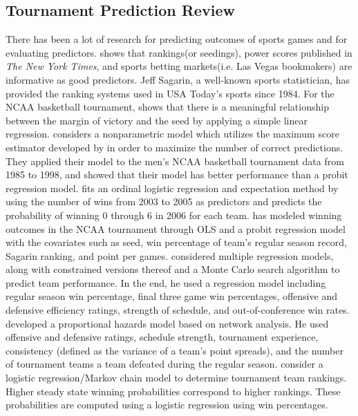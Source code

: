 \subsection{Tournament Prediction Review}
There has been a lot of research for predicting outcomes of sports games and for evaluating predictors. \cite{boulier2003predicting} shows that rankings(or seedings), power scores published in \emph{The New York Times}, and sports betting markets(i.e. Las Vegas bookmakers) are informative as good predictors. Jeff Sagarin, a well-known sports statistician, has provided the ranking systems used in USA Today's sports since 1984. For the NCAA basketball tournament, \cite{smith1999can} shows that there is a meaningful relationship between the margin of victory and the seed by applying a simple linear regression. \cite{caudill2003predicting} considers a nonparametric model which utilizes the maximum score estimator developed by \cite{manski1977estimation} in order to maximize the number of correct predictions. They applied their model to the men's NCAA basketball tournament data from 1985 to 1998, and showed that their model has better performance than a probit regression model. \cite{west2006simple} fits an ordinal logistic regression and expectation method by using the number of wins from 2003 to 2005 as predictors and predicts the probability of winning 0 through 6 in 2006 for each team. \cite{wright2012statistical} has modeled winning outcomes in the NCAA tournament through OLS and a probit regression model with the covariates such as seed, win percentage of team's regular season record, Sagarin ranking, and point per games. \cite{rosenthal} considered multiple regression models, along with constrained versions thereof and a Monte Carlo search algorithm to predict team performance. In the end, he used a regression model including regular season win percentage, final three game win percentages, offensive and defensive efficiency ratings, strength of schedule, and out-of-conference win rates. \cite{ezekowitz2013} developed a proportional hazards model based on network analysis. He used offensive and defensive ratings, schedule strength, tournament experience, consistency (defined as the variance of a team's point spreads), and the number of tournament teams a team defeated during the regular season. \cite{Kvam2006} consider a logistic regression/Markov chain model to determine tournament team rankings. Higher steady state winning probabilities correspond to higher rankings. These probabilities are computed using a logistic regression using win percentages.


